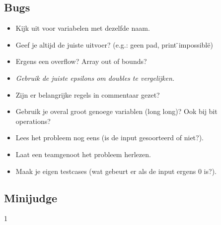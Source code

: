 \documentclass[10pt,a4paper,titlepage]{article}
\DeclareMathOperator{\bigO}{\mathcal{O}}
\renewcommand{\O}{\mathcal{O}}
\begin{document}
\subsection{Bugs}
\begin{multicols}{2}
\begin{itemize}[noitemsep,nolistsep]
\item Kijk uit voor variabelen met dezelfde naam.
\item Geef je altijd de juiste uitvoer? (e.g.: geen pad, print \"{}impossible\"{})
\item Ergens een overflow? Array out of bounds?
\item \emph{Gebruik de juiste epsilons om doubles te vergelijken.}
\item Zijn er belangrijke regels in commentaar gezet?%
\item Gebruik je overal groot genoege variablen (long long)? Ook bij bit operations?
\item Lees het probleem nog eens (is de input gesoorteerd of niet?).
\item Laat een teamgenoot het probleem herlezen.
\item Maak je eigen testcases (wat gebeurt er als de input ergens 0 is?).
\end{itemize}

\end{multicols}

\subsection{Minijudge}





1

\renewcommand{\bigO}[1]{$\O(#1)$}
\end{document}
